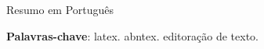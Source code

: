 \begin{resumo}

Resumo em Português

\vspace{\onelineskip}
\noindent
\textbf{Palavras-chave}: latex. abntex. editoração de texto.

\end{resumo}